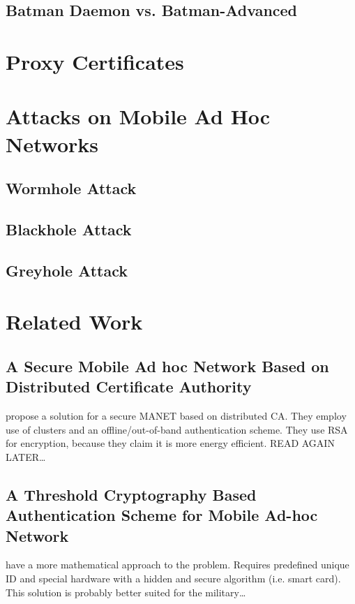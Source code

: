\subsection{Batman Daemon vs. Batman-Advanced}




\section{Proxy Certificates}

\section{Attacks on Mobile Ad Hoc Networks}
\subsection{Wormhole Attack}
\subsection{Blackhole Attack}
\subsection{Greyhole Attack}

\section{Related Work}

\subsection{A Secure Mobile Ad hoc Network Based on Distributed Certificate
Authority}
\cite{hosseinisecure} propose a solution for a secure MANET based on distributed
CA. They employ use of clusters and an offline/out-of-band authentication
scheme. They use RSA for encryption, because they claim it is more energy
efficient. READ AGAIN LATER\ldots

\subsection{A Threshold Cryptography Based Authentication Scheme for Mobile
Ad-hoc Network}
\cite{springerlink:Haimabati} have a more mathematical approach
to the problem. Requires predefined unique ID and special hardware with a hidden
and secure algorithm (i.e. smart card). This solution is probably better suited
for the military\ldots
